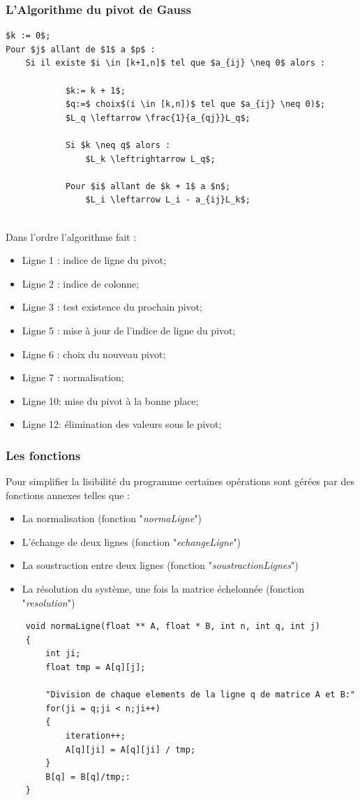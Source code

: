 \documentclass[a4paper]{article}
\begin{document}
\subsubsection{L'Algorithme du pivot de Gauss}

\begin{lstlisting}
$k := 0$;
Pour $j$ allant de $1$ a $p$ :
	Si il existe $i \in [k+1,n]$ tel que $a_{ij} \neq 0$ alors : 
			
			$k:= k + 1$;
			$q:=$ choix$(i \in [k,n])$ tel que $a_{ij} \neq 0)$;
			$L_q \leftarrow \frac{1}{a_{qj}}L_q$;
			
			Si $k \neq q$ alors :
				$L_k \leftrightarrow L_q$;
			
			Pour $i$ allant de $k + 1$ a $n$;
				$L_i \leftarrow L_i - a_{ij}L_k$;
						
\end{lstlisting}

Dans l'ordre l'algorithme fait :

\begin{itemize}
	\item Ligne 1 : indice de ligne du pivot;
	\item Ligne 2 : indice de colonne;
	\item Ligne 3 : test existence du prochain pivot;
	\item Ligne 5 : mise à jour de l'indice de ligne du pivot;
	\item Ligne 6 : choix du nouveau pivot;
	\item Ligne 7 : normalisation;
	\item Ligne 10: mise du pivot à la bonne place;
	\item Ligne 12: élimination des valeurs sous le pivot;						
\end{itemize} 

\subsubsection{Les fonctions}

Pour simplifier la lisibilité du programme certaines opérations sont gérées par des fonctions annexes telles que :
\newline
\begin{itemize}
	\item La normalisation (fonction "\textit{normaLigne}")
	\item L'échange de deux lignes (fonction "\textit{echangeLigne}")
	\item La soustraction entre deux lignes (fonction "\textit{soustractionLignes}")
	\item La résolution du système, une fois la matrice échelonnée (fonction "\textit{resolution}")
\end{itemize}
\clearpage
\begin{lstlisting}
	void normaLigne(float ** A, float * B, int n, int q, int j)
	{
		int ji;
		float tmp = A[q][j];
		
		"Division de chaque elements de la ligne q de matrice A et B:"
		for(ji = q;ji < n;ji++)
		{
			iteration++;
			A[q][ji] = A[q][ji] / tmp;
		}
		B[q] = B[q]/tmp;: 
	}
\end{lstlisting}
\end{document}
